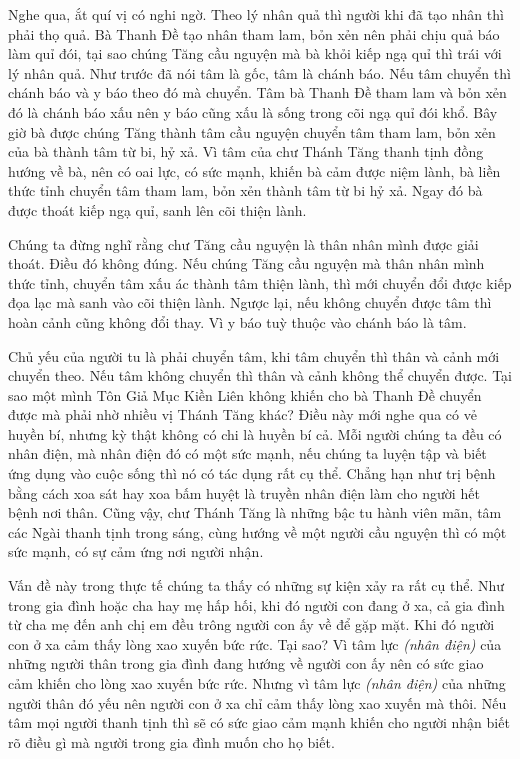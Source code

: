 \documentclass[
  12pt,
  oneside]{book}
\begin{document}
Nghe qua, ắt quí vị có nghi ngờ. Theo lý nhân quả thì người khi đã tạo nhân thì phải thọ quả. Bà Thanh Đề tạo nhân tham lam, bỏn xẻn nên phải chịu quả báo làm quỉ đói, tại sao chúng Tăng cầu nguyện mà bà khỏi kiếp ngạ quỉ thì trái với lý nhân quả. Như trước đã nói tâm là gốc, tâm là chánh báo. Nếu tâm chuyển thì chánh báo và y báo theo đó mà chuyển. Tâm bà Thanh Đề tham lam và bỏn xẻn đó là chánh báo xấu nên y báo cũng xấu là sống trong cõi ngạ quỉ đói khổ. Bây giờ bà được chúng Tăng thành tâm cầu nguyện chuyển tâm tham lam, bỏn xẻn của bà thành tâm từ bi, hỷ xả. Vì tâm của chư Thánh Tăng thanh tịnh đồng hướng về bà, nên có oai lực, có sức mạnh, khiến bà cảm được niệm lành, bà liền thức tỉnh chuyển tâm tham lam, bỏn xẻn thành tâm từ bi hỷ xả. Ngay đó bà được thoát kiếp ngạ quỉ, sanh lên cõi thiện lành.

Chúng ta đừng nghĩ rằng chư Tăng cầu nguyện là thân nhân mình được giải thoát. Điều đó không đúng. Nếu chúng Tăng cầu nguyện mà thân nhân mình thức tỉnh, chuyển tâm xấu ác thành tâm thiện lành, thì mới chuyển đổi được kiếp đọa lạc mà sanh vào cõi thiện lành. Ngược lại, nếu không chuyển được tâm thì hoàn cảnh cũng không đổi thay. Vì y báo tuỳ thuộc vào chánh báo là tâm.

Chủ yếu của người tu là phải chuyển tâm, khi tâm chuyển thì thân và cảnh mới chuyển theo. Nếu tâm không chuyển thì thân và cảnh không thể chuyển được. Tại sao một mình Tôn Giả Mục Kiền Liên không khiến cho bà Thanh Đề chuyển được mà phải nhờ nhiều vị Thánh Tăng khác? Điều này mới nghe qua có vẻ huyền bí, nhưng kỳ thật không có chi là huyền bí cả. Mỗi người chúng ta đều có nhân điện, mà nhân điện đó có một sức mạnh, nếu chúng ta luyện tập và biết ứng dụng vào cuộc sống thì nó có tác dụng rất cụ thể. Chẳng hạn như trị bệnh bằng cách xoa sát hay xoa bấm huyệt là truyền nhân điện làm cho người hết bệnh nơi thân. Cũng vậy, chư Thánh Tăng là những bậc tu hành viên mãn, tâm các Ngài thanh tịnh trong sáng, cùng hướng về một người cầu nguyện thì có một sức mạnh, có sự cảm ứng nơi người nhận.

Vấn đề này trong thực tế chúng ta thấy có những sự kiện xảy ra rất cụ thể. Như trong gia đình hoặc cha hay mẹ hấp hối, khi đó người con đang ở xa, cả gia đình từ cha mẹ đến anh chị em đều trông người con ấy về để gặp mặt. Khi đó người con ở xa cảm thấy lòng xao xuyến bức rức. Tại sao? Vì tâm lực \emph{(nhân điện)} của những người thân trong gia đình đang hướng về người con ấy nên có sức giao cảm khiến cho lòng xao xuyến bức rức. Nhưng vì tâm lực \emph{(nhân điện)} của những người thân đó yếu nên người con ở xa chỉ cảm thấy lòng xao xuyến mà thôi. Nếu tâm mọi người thanh tịnh thì sẽ có sức giao cảm mạnh khiến cho người nhận biết rõ điều gì mà người trong gia đình muốn cho họ biết.
\end{document}
